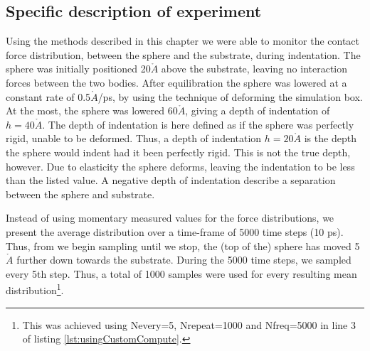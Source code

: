 \documentclass[twoside,english]{uiofysmaster}
\begin{document}
\subsection{Specific description of experiment} \label{sec:resultsRadialForceDistributionSpecificDescriptionOfExperiment}
Using the methods described in this chapter we were able to monitor the contact force distribution, between the sphere and the substrate, during indentation. 
The sphere was initially positioned 20$\mathring{A}$ above the substrate, leaving no interaction forces between the two bodies.  
After equilibration the sphere was lowered at a constant rate of 0.5$\mathring{A}$/ps, by using the technique of deforming the simulation box. 
At the most, the sphere was lowered 60$\mathring{A}$, giving a depth of indentation of $h=40\mathring{A}$. 
The depth of indentation is here defined as if the sphere was perfectly rigid, unable to be deformed. 
Thus, a depth of indentation $h=20 \mathring{A}$ is the depth the sphere would indent had it been perfectly rigid. 
This is not the true depth, however. 
Due to elasticity the sphere deforms, leaving the indentation to be less than the listed value. 
A negative depth of indentation describe a separation between the sphere and substrate.   


Instead of using momentary measured values for the force distributions, we present the average distribution over a time-frame of 5000 time steps (10 ps). 
Thus, from we begin sampling until we stop, the (top of the) sphere has moved 5$\mathring{A}$ further down towards the substrate.  
During the 5000 time steps, we sampled every 5th step. 
Thus, a total of 1000 samples were used for every resulting mean distribution\footnote{This was achieved using  Nevery=5,  Nrepeat=1000 and Nfreq=5000 in line 3 of listing \ref{lst:usingCustomCompute}.}.
\end{document}
